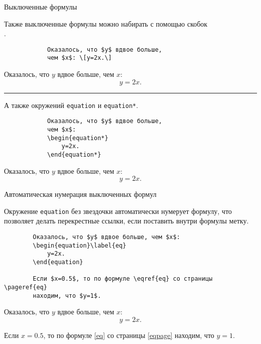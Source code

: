 \begin{frame}[fragile]{Выключенные формулы}
	
	Также выключенные формулы можно набирать с помощью скобок \texttt{\[\]}. 
	
	\begin{minipage}{0.49\textwidth}
		\begin{verbatim}
			Оказалось, что $y$ вдвое больше, 
			чем $x$: \[y=2x.\]
		\end{verbatim}
	\end{minipage}
	\begin{minipage}{0.49\textwidth}
		Оказалось, что $y$ вдвое больше, чем $x$: \[y=2x.\]
	\end{minipage}

	
	\noindent\rule{\textwidth}{1pt}
	А также окружений \texttt{equation} и \texttt{equation*}.
	
	\begin{minipage}{0.49\textwidth}
		\begin{verbatim}
			Оказалось, что $y$ вдвое больше, 
			чем $x$: 
			\begin{equation*}
				y=2x.
			\end{equation*}
		\end{verbatim}
	\end{minipage}
	\begin{minipage}{0.49\textwidth}
		Оказалось, что $y$ вдвое больше, 
		чем $x$: 
		\begin{equation*}
			y=2x.
		\end{equation*}
	\end{minipage}
	
	
\end{frame}


\begin{frame}[fragile]{Автоматическая нумерация выключенных формул}

	Окружение \texttt{equation} без звездочки автоматически нумерует формулу, что позволяет делать перекрестные ссылки, если поставить внутри формулы метку.
	
	\begin{verbatim}
		Оказалось, что $y$ вдвое больше, чем $x$: 
		\begin{equation}\label{eq}
			y=2x.
		\end{equation}
	
		Если $x=0.5$, то по формуле \eqref{eq} со страницы \pageref{eq} 
		находим, что $y=1$.
	\end{verbatim}
	\label{eqpage}Оказалось, что $y$ вдвое больше, чем $x$: 
	\begin{equation}\label{eq}
		y=2x.
	\end{equation}
	
	Если $x=0.5$, то по формуле \eqref{eq} со страницы \ref{eqpage} находим, что $y=1$.
\end{frame}

